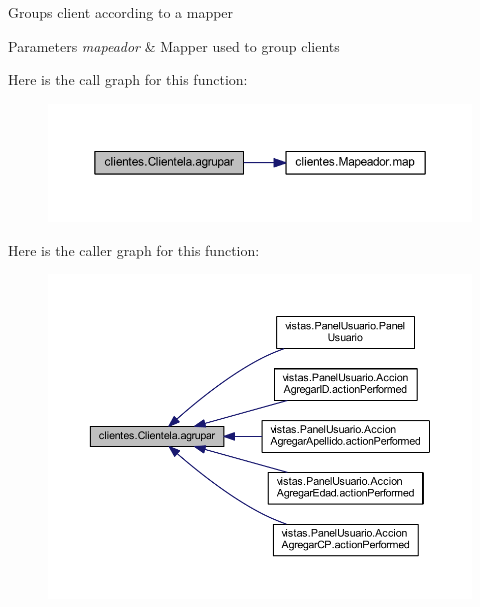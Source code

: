 Groups client according to a mapper 
\begin{DoxyParams}{Parameters}
{\em mapeador} & Mapper used to group clients \\
\hline
\end{DoxyParams}
Here is the call graph for this function\+:\nopagebreak
\begin{figure}[H]
\begin{center}
\leavevmode
\includegraphics[width=350pt]{classclientes_1_1_clientela_ae120fcd5a51e1d17d11e3b36ca1d8290_cgraph}
\end{center}
\end{figure}
Here is the caller graph for this function\+:\nopagebreak
\begin{figure}[H]
\begin{center}
\leavevmode
\includegraphics[width=350pt]{classclientes_1_1_clientela_ae120fcd5a51e1d17d11e3b36ca1d8290_icgraph}
\end{center}
\end{figure}
\mbox{\label{classclientes_1_1_clientela_a2892095286ae0f52220099674a8b90d8}} 
